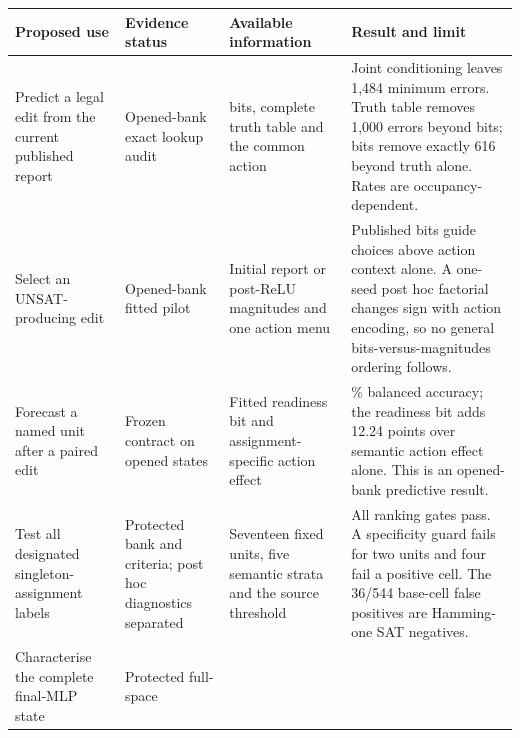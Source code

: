 \documentclass[
  british,
  11pt,
  a4paper,
]{article}
\newcounter{none} %
\begin{document}
{\def\LTcaptype{none} %
\begin{longtable}[]{@{}
  >{\raggedright\arraybackslash}p{}
  >{\raggedright\arraybackslash}p{}
  >{\raggedright\arraybackslash}p{}
  >{\raggedright\arraybackslash}p{}@{}}
\toprule\noalign{}
\begin{minipage}[b]{\linewidth}\raggedright
Proposed use
\end{minipage} & \begin{minipage}[b]{\linewidth}\raggedright
Evidence status
\end{minipage} & \begin{minipage}[b]{\linewidth}\raggedright
Available information
\end{minipage} & \begin{minipage}[b]{\linewidth}\raggedright
Result and limit
\end{minipage} \\
\midrule\noalign{}
\endhead
\bottomrule\noalign{}
\endlastfoot
Predict a legal edit from the current published report & Opened-bank
exact lookup audit & 34 bits, complete truth table and the common action
& Joint conditioning leaves 1,484 minimum errors. Truth table removes
1,000 errors beyond bits; bits remove exactly 616 beyond truth alone.
Rates are occupancy-dependent. \\
Select an UNSAT-producing edit & Opened-bank fitted pilot & Initial
report or post-ReLU magnitudes and one action menu & Published bits
guide choices above action context alone. A one-seed post hoc factorial
changes sign with action encoding, so no general bits-versus-magnitudes
ordering follows. \\
Forecast a named unit after a paired edit & Frozen contract on opened
states & Fitted readiness bit and assignment-specific action effect &
90.95\% balanced accuracy; the readiness bit adds 12.24 points over
semantic action effect alone. This is an opened-bank predictive
result. \\
Test all designated singleton-assignment labels & Protected bank and
criteria; post hoc diagnostics separated & Seventeen fixed units, five
semantic strata and the source threshold & All ranking gates pass. A
specificity guard fails for two units and four fail a positive cell. The
36/544 base-cell false positives are Hamming-one SAT negatives. \\
Characterise the complete final-MLP state & Protected full-space

\end{longtable}}
\end{document}
